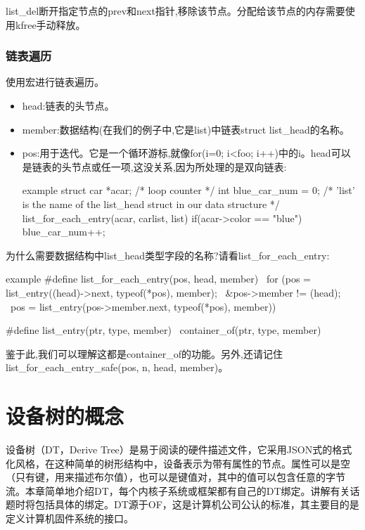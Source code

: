 \documentclass[lang=cn,newtx,10pt,scheme=chinese]{elegantbook}
\begin{document}
\begin{marker}
list\_del断开指定节点的prev和next指针,移除该节点。分配给该节点的内存需要使用kfree手动释放。
\end{marker}

\subsection{链表遍历}

使用宏进行链表遍历。

\begin{itemize}
\item head:链表的头节点。
\item member:数据结构(在我们的例子中,它是list)中链表struct list\_head的名称。
\item pos:用于迭代。它是一个循环游标,就像for(i=0; i<foo; i++)中的i。head可以是链表的头节点或任一项,这没关系,因为所处理的是双向链表:
\begin{mycode}{example}
struct car *acar; /* loop counter */
int blue_car_num = 0;
/* 'list' is the name of the list_head struct in our data structure */
list_for_each_entry(acar, carlist, list) {
    if(acar->color == "blue")
        blue_car_num++;
}
\end{mycode}
\end{itemize}

为什么需要数据结构中list\_head类型字段的名称?请看list\_for\_each\_entry:

\begin{mycode}{example}
#define list_for_each_entry(pos, head, member)                  \
for (pos = list_entry((head)->next, typeof(*pos), member);      \
    &pos->member != (head);                                     \
    pos = list_entry(pos->member.next, typeof(*pos), member))

#define list_entry(ptr, type, member)                           \
    container_of(ptr, type, member)
\end{mycode}

鉴于此,我们可以理解这都是container\_of的功能。另外,还请记住list\_for\_each\_entry\_safe(pos, n, head, member)。

\chapter{设备树的概念}

设备树（DT，Derive Tree）是易于阅读的硬件描述文件，它采用JSON式的格式化风格，在这种简单的树形结构中，设备表示为带有属性的节点。属性可以是空（只有键，用来描述布尔值），也可以是键值对，其中的值可以包含任意的字节流。本章简单地介绍DT，每个内核子系统或框架都有自己的DT绑定。讲解有关话题时将包括具体的绑定。DT源于OF，这是计算机公司公认的标准，其主要目的是定义计算机固件系统的接口。
\end{document}
